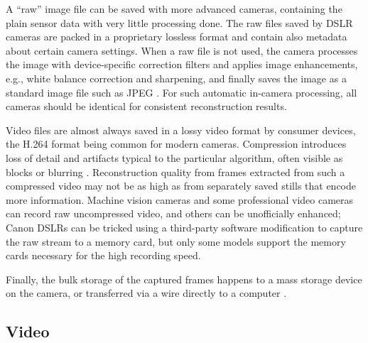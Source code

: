 
A ``raw'' image file can be saved with more advanced cameras, containing the plain sensor data with very little processing done.
The raw files saved by DSLR cameras are packed in a proprietary lossless format and contain also metadata about certain camera settings.
When a raw file is not used, the camera processes the image with device-specific correction filters and applies image enhancements, e.g., white balance correction and sharpening, and finally saves the image as a standard image file such as JPEG \cite{szeliski10vision}.
For such automatic in-camera processing, all cameras should be identical for consistent reconstruction results.


Video files are almost always saved in a lossy video format by consumer devices, the H.264 format being common for modern cameras.
Compression introduces loss of detail and artifacts typical to the particular algorithm, often visible as blocks or blurring \cite{richardson2004h264}.
Reconstruction quality from frames extracted from such a compressed video may not be as high as from separately saved stills that encode more information.
Machine vision cameras and some professional video cameras can record raw uncompressed video, and others can be unofficially enhanced;
Canon DSLRs can be tricked using a third-party software modification \cite{magiclantern} to capture the raw stream to a memory card, but only some models support the memory cards necessary for the high recording speed.

Finally, the bulk storage of the captured frames happens to a mass storage device on the camera, or transferred via a wire directly to a computer \cite{hornberg2007handbook,ni2013choosing}.


\subsection{Video} \label{sec:video} %

